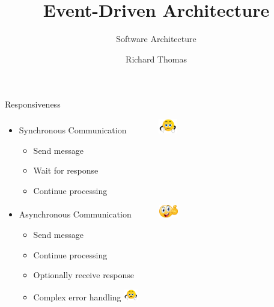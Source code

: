 \documentclass{slide}
\title{Event-Driven Architecture}
\subtitle{Software Architecture}
\author{Richard Thomas}
\date{\week{6}}
\begin{document}
\maketitle




\begin{frame}{Responsiveness}
    \vspace{1mm}
    {\LARGE
    \begin{itemize}
        \item Synchronous Communication ~~~~~~~\includegraphics[trim=22 19 22 12,clip,width=8mm]{../../shared/images/thumbs-down.png}
        \begin{itemize}
            \Large\item Send message
            \Large\item Wait for response
            \Large\item Continue processing
        \end{itemize}
        \vspace{3mm}
        \item<2-> Asynchronous Communication ~~~~~~\includegraphics[width=8mm]{../../shared/images/thumbs-up.png}
        \begin{itemize}
            \Large\item Send message
            \Large\item Continue processing
            \Large\item Optionally receive response
            \Large\item Complex error handling \tabto{16em}\includegraphics[trim=22 19 22 12,clip,width=6mm]{../../shared/images/thumbs-down.png}
	\end{itemize}
    \end{itemize}
    }
\end{frame}
\end{document}
